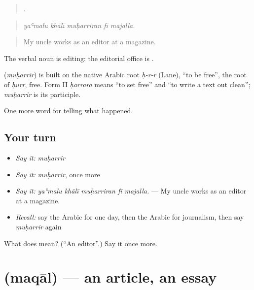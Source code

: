 \begin{quote}
    .
\end{quote}

\begin{quote}
\emph{yaʿmalu khālī muḥarriran fī majalla.}
\end{quote}

\begin{quote}
My uncle works as an editor at a magazine.
\end{quote}

The verbal noun  is editing: the editorial office is  .

\begin{cousinweb}
\textbf{} (\emph{muḥarrir}) is built on the native Arabic root \emph{ḥ-r-r} (Lane), \textquotedblleft{}to be free\textquotedblright{}, the root of \emph{ḥurr}, free. Form II \emph{ḥarrara} means \textquotedblleft{}to set free\textquotedblright{} and \textquotedblleft{}to write a text out clean\textquotedblright{}; \emph{muḥarrir} is its participle.
\end{cousinweb}

\begin{grammarlens}[title={What you've built}]
One more word for telling what happened.
\end{grammarlens}

\subsection*{Your turn}
\begin{itemize}
\raggedright
  \item \emph{Say it:} \emph{muḥarrir}
  \item \emph{Say it:} \emph{muḥarrir}, once more
  \item \emph{Say it:} \emph{yaʿmalu khālī muḥarriran fī majalla.} — My uncle works as an editor at a magazine.
  \item \emph{Recall:} say the Arabic for one day, then the Arabic for journalism, then say \emph{muḥarrir} again
\end{itemize}

\begin{tcolorbox}[breakable,colback=teal!4,colframe=teal!35!black,title={Before you move on}]
What does  mean? (\textquotedblleft{}An editor\textquotedblright{}.) Say it once more.
\end{tcolorbox}
\section[\texorpdfstring{\ar{مقال} (maqāl)}{مقال (maqāl)}]{ (maqāl) — an article, an essay}

